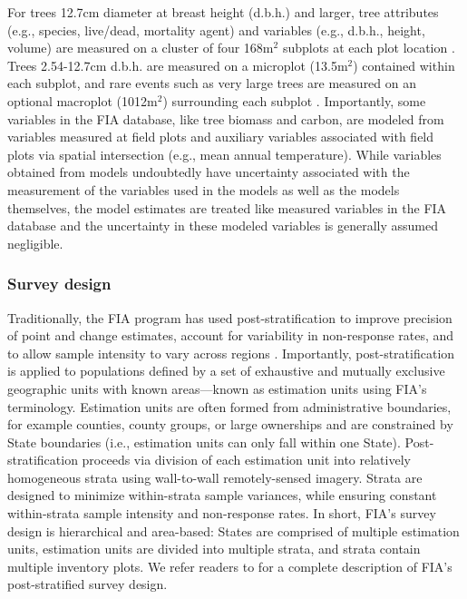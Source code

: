 \documentclass[11pt]{article}
\begin{document}
For trees 12.7cm diameter at breast height (d.b.h.) and larger, tree attributes (e.g., species, live/dead, mortality agent) and variables (e.g., d.b.h., height, volume) are measured on a cluster of four 168$\mathrm{m}^2$ subplots at each plot location \citep{bechtold2005enhanced}. Trees 2.54-12.7cm d.b.h. are measured on a microplot (13.5$\mathrm{m}^2$) contained within each subplot, and rare events such as very large trees are measured on an optional macroplot (1012$\mathrm{m}^2$) surrounding each subplot \citep{bechtold2005enhanced}. Importantly, some variables in the FIA database, like tree biomass and carbon, are modeled from variables measured at field plots and auxiliary variables associated with field plots via spatial intersection (e.g., mean annual temperature). While variables obtained from models undoubtedly have uncertainty associated with the measurement of the variables used in the models as well as the models themselves, the model estimates are treated like measured variables in the FIA database and the uncertainty in these modeled variables is generally assumed negligible.

\subsubsection*{Survey design}
Traditionally, the FIA program has used post-stratification to improve precision of point and change estimates, account for variability in non-response rates, and to allow sample intensity to vary across regions \citep{bechtold2005enhanced, tinkham2018applications, smith2002forest}. Importantly, post-stratification is applied to populations defined by a set of exhaustive and mutually exclusive geographic units with known areas---known as estimation units using FIA's terminology. Estimation units are often formed from administrative boundaries, for example counties, county groups, or large ownerships and are constrained by State boundaries (i.e., estimation units can only fall within one State). Post-stratification proceeds via division of each estimation unit into relatively homogeneous strata using wall-to-wall remotely-sensed imagery. Strata are designed to minimize within-strata sample variances, while ensuring constant within-strata sample intensity and non-response rates. In short, FIA's survey design is hierarchical and area-based: States are comprised of multiple estimation units, estimation units are divided into multiple strata, and strata contain multiple inventory plots. We refer readers to \citet{bechtold2005enhanced} for a complete description of FIA's post-stratified survey design.
\end{document}
